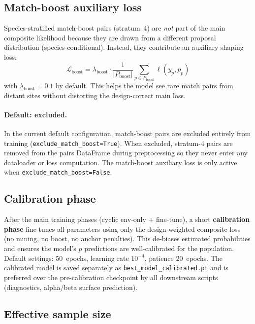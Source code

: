 \documentclass{article}
\begin{document}
\subsection{Match-boost auxiliary loss}

Species-stratified match-boost pairs (stratum~4) are \emph{not} part of the main composite likelihood because they are drawn from a different proposal distribution (species-conditional). Instead, they contribute an auxiliary shaping loss:
\begin{equation}
    \mathcal{L}_{\text{boost}} = \lambda_{\text{boost}} \cdot \frac{1}{|P_{\text{boost}}|} \sum_{p \in P_{\text{boost}}} \ell(y_p, p_p)
\end{equation}
with $\lambda_{\text{boost}} = 0.1$ by default. This helps the model see rare match pairs from distant sites without distorting the design-correct main loss.

\paragraph{Default: excluded.} In the current default configuration, match-boost pairs are excluded entirely from training (\texttt{exclude\_match\_boost=True}). When excluded, stratum-4 pairs are removed from the pairs DataFrame during preprocessing so they never enter any dataloader or loss computation. The match-boost auxiliary loss is only active when \texttt{exclude\_match\_boost=False}.

\subsection{Calibration phase}

After the main training phases (cyclic env-only + fine-tune), a short \textbf{calibration phase} fine-tunes all parameters using only the design-weighted composite loss (no mining, no boost, no anchor penalties). This de-biases estimated probabilities and ensures the model's $p$ predictions are well-calibrated for the population. Default settings: 50~epochs, learning rate $10^{-4}$, patience 20~epochs. The calibrated model is saved separately as \texttt{best\_model\_calibrated.pt} and is preferred over the pre-calibration checkpoint by all downstream scripts (diagnostics, alpha/beta surface prediction).

\subsection{Effective sample size}
\end{document}
